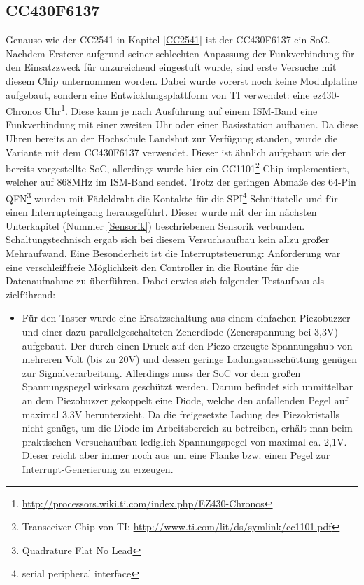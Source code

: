\documentclass[12pt]{scrreprt} %
\begin{document}
\subsection{CC430F6137}
Genauso wie der CC2541 in Kapitel \vref{CC2541} ist der CC430F6137 ein SoC. Nachdem Ersterer aufgrund seiner schlechten Anpassung der Funkverbindung für den Einsatzzweck für unzureichend eingestuft wurde, sind erste Versuche mit diesem Chip unternommen worden. Dabei wurde vorerst noch keine Modulplatine aufgebaut, sondern eine Entwicklungsplattform von TI verwendet: eine ez430-Chronos Uhr\footnote{\url{http://processors.wiki.ti.com/index.php/EZ430-Chronos}}. Diese kann je nach Ausführung auf einem ISM-Band eine Funkverbindung mit einer zweiten Uhr oder einer Basisstation aufbauen. Da diese Uhren bereits an der Hochschule Landshut zur Verfügung standen, wurde die Variante mit dem CC430F6137 verwendet.  Dieser ist ähnlich aufgebaut wie der bereits vorgestellte SoC, allerdings wurde hier ein CC1101\footnote{Transceiver Chip von TI: \url{http://www.ti.com/lit/ds/symlink/cc1101.pdf}} Chip implementiert, welcher auf 868MHz im ISM-Band sendet. Trotz der geringen Abmaße des 64-Pin QFN\footnote{Quadrature Flat No Lead} wurden mit Fädeldraht die Kontakte für die SPI\footnote{serial peripheral interface}-Schnittstelle und für einen Interrupteingang herausgeführt. Dieser wurde mit der im nächsten Unterkapitel (Nummer \vref{Sensorik}) beschriebenen Sensorik verbunden. Schaltungstechnisch ergab sich bei diesem Versuchsaufbau kein allzu großer Mehraufwand. Eine Besonderheit ist die Interruptsteuerung: Anforderung war eine verschleißfreie Möglichkeit den Controller in die Routine für die Datenaufnahme zu überführen. Dabei erwies sich folgender Testaufbau als zielführend:
\begin{itemize}
\item
Für den Taster wurde eine Ersatzschaltung aus einem einfachen Piezobuzzer und einer dazu parallelgeschalteten Zenerdiode (Zenerspannung bei 3,3V) aufgebaut. Der durch einen Druck auf den Piezo erzeugte Spannungshub von mehreren Volt (bis zu 20V) und dessen geringe Ladungsausschüttung genügen zur Signalverarbeitung. Allerdings muss der SoC vor dem großen Spannungspegel wirksam geschützt werden. Darum befindet sich unmittelbar an dem Piezobuzzer gekoppelt eine Diode, welche den anfallenden Pegel auf maximal 3,3V herunterzieht. Da die freigesetzte Ladung des Piezokristalls nicht genügt, um die Diode im Arbeitsbereich zu betreiben, erhält man beim praktischen Versuchaufbau lediglich Spannungspegel von maximal ca. 2,1V. Dieser reicht aber immer noch aus um eine Flanke bzw. einen Pegel zur Interrupt-Generierung zu erzeugen. 
\end{itemize}
\end{document}
